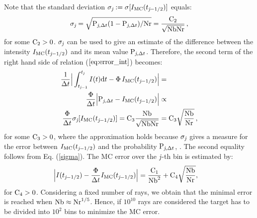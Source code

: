 Note that the standard deviation $\sigma_{\textit{j}}:=\sigma[I_{\textrm{MC}}(t_{\textit{j}-1/2})]$ equals:
\begin{equation}\label{sigma}
\sigma_{\textit{j}}= \sqrt{\textrm{P}_{\textit{j}, \Delta t}(1-\textrm{P}_{\textit{j}, \Delta t})/\textrm{Nr}}= \frac{\textrm{C}_2}{\sqrt{\textrm{Nb}\textrm{Nr}}}\,, \end{equation}
 for some $\textrm{C}_{2}>0$. $\sigma_{\textit{j}}$ can be used to give an estimate of the difference between the intensity $I_{\textrm{MC}}(t_{\textit{j}-1/2})$ and its mean value $\textrm{P}_{\textit{j}, \Delta t}$.
Therefore, the second term of the right hand side of relation ($\ref{eq:error_int}$) becomes:
\begin{equation}\begin{aligned}
\frac{1}{\Delta t}\Big|\int_{t_{\textit{j}-1}}^{t_{\textit{j}}} I(t)\textrm{d}t -
\Phi\, I_{\textrm{MC}}(t_{\textit{j}-1/2})\Big| &=  \\
\frac{\Phi}{\Delta t}\Big|\textrm{P}_{\textit{j}, \Delta t} -I_{\textrm{MC}}(t_{\textit{j}-1/2})\Big| &\propto  \\
  \frac{\Phi}{\Delta t}
\sigma_{\textit{j}}[I_{\textrm{MC}}(t_{\textit{j}-1/2})]=\textrm{C}_3\frac{\textrm{Nb}}{\sqrt{\textrm{Nb}\textrm{Nr}}} & = \textrm{C}_3\sqrt{\frac{\textrm{Nb}}{\textrm{Nr}}}\,,
\end{aligned}
\end{equation}
for some $\textrm{C}_3>0$, where the approximation holds because $\sigma_{\textit{j}}$ gives a measure for the error between
$I_{\textrm{MC}}(t_{\textit{j}-1/2})$ and the probability $\textrm{P}_{\textit{j}, \Delta t}$, \cite{diez2012openintro}. The second equality follows from Eq. (\ref{sigma}). The MC error over the $\textit{j}$-th bin is estimated by:
\begin{equation} \begin{aligned}
\Big|I(t_{\textit{j}-1/2})&-\frac{\Phi}
{\Delta t}I_{\textrm{MC}}(t_{\textit{j}-1/2})\Big| =
\frac{\textrm{C}_1}{\textrm{Nb}^2} + \textrm{C}_4\sqrt{\frac{\textrm{Nb}}{\textrm{Nr}}},
\end{aligned}
\end{equation}
for $\textrm{C}_4>0$.
Considering a fixed number of rays, we obtain that the minimal error is reached when $\textrm{Nb}\approx \textrm{Nr}^{1/5}$.
Hence, if $10^{10}$ rays are considered the target has to be divided into $10^2$ bins to minimize the MC error.
